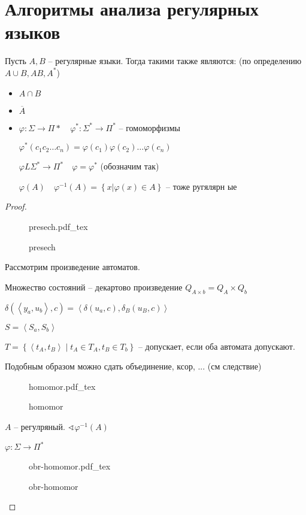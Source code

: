 \documentclass{book}
\theoremstyle{definition}
\newcommand{\incfig}[1]{%
    \def\svgwidth{\columnwidth}
    {#1.pdf_tex}
}
\begin{document}
\section{Алгоритмы анализа регулярных языков}

\begin{theorem}
    Пусть $A,B$ -- регулярные языки. Тогда такими также являются: (по определению  $A\cup B, AB, A^*$)
    \begin{itemize}
        \item $A\cap B$\\
        \item $\overline{A}$\\
        \item $\varphi:\Sigma \to \Pi*\quad \varphi^*:\Sigma^* \to \Pi^*$ -- гомоморфизмы

            $\varphi^*\left( c_1c_2\ldots c_n \right) =\varphi\left( c_1 \right) \varphi\left( c_2 \right) \ldots \varphi\left( c_n \right) $

            $\varphi L\Sigma^* \to \Pi^*\quad \varphi = \varphi^*$ (обозначим так)

            $\varphi(A)\quad \varphi^{-1}(A) = \left\{ x|\varphi(x)\in A \right\} $ -- тоже ругялярн ые
    \end{itemize}
\end{theorem}
\begin{proof}
\begin{figure}[!ht]
    \centering
    \incfig{presech}
    \caption{presech}
    \label{fig:presech}
\end{figure}

Рассмотрим произведение автоматов.

Множество состояний -- декартово произведение $Q_{A\times b} = Q_A\times Q_b$

$\delta\left( \left<y_a, u_b \right>, c \right)  = \left<\delta\left( u_a, c \right) , \delta_B\left( u_B, c \right)  \right>$

$S = \left<S_a, S_b \right>$

$T = \left\{ \left<t_A, t_B \right> \mid t_A\in T_A, t_B\in T_b \right\} $ -- допускает, если оба автомата допускают.

Подобным образом можно сдать объединение, ксор, ... (см следствие)

\begin{figure}[!ht]
    \centering
    \incfig{homomor}
    \caption{homomor}
    \label{fig:homomor}
\end{figure}

$A$ -- регулряный.  $\sphericalangle \varphi^{-1}(A)$

$\varphi:\Sigma \to \Pi^*$

\begin{figure}[!ht]
    \centering
    \incfig{obr-homomor}
    \caption{obr-homomor}
    \label{fig:obr-homomor}
\end{figure}
\end{proof}
\end{document}
